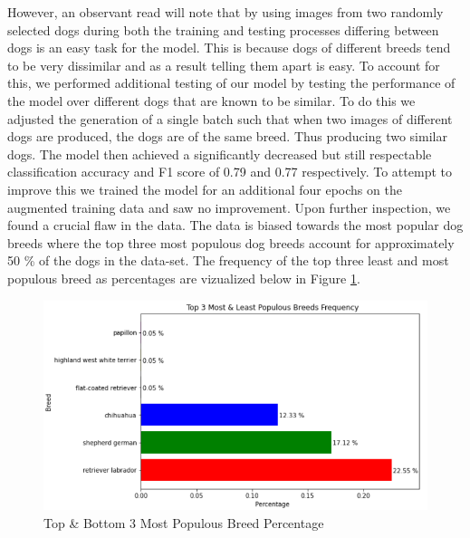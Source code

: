 \documentclass{article}
\begin{document}
However, an observant read will note that by using images from two randomly selected dogs during both the training and testing processes differing between dogs is an easy task for the model.  This is because dogs of different breeds tend to be very dissimilar and as a result telling them apart is easy.  To account for this, we performed additional testing of our model by testing the performance of the model over different dogs that are known to be similar.  To do this we adjusted the generation of a single batch such that when two images of different dogs are produced, the dogs are of the same breed.  Thus producing two similar dogs.  The model then achieved a significantly decreased but still respectable classification accuracy and F1 score of 0.79 and 0.77 respectively.   To attempt to improve this we trained the model for an additional four epochs on the augmented training data and saw no improvement.  Upon further inspection, we found a crucial flaw in the data.  The data is biased towards the most popular dog breeds where the top three most populous dog breeds account for approximately 50 \% of the dogs in the data-set.  The frequency of the top three least and most populous breed as percentages are vizualized below in Figure \ref{fig:x breed distr}.

\begin{figure}[]
\centering
	\includegraphics[scale=0.7]{final-report-images/breed_distr.png}
\caption{Top \& Bottom 3 Most Populous Breed Percentage}
\label{fig:x breed distr}
\end{figure}

\newpage
\end{document}
